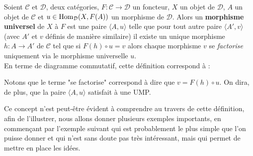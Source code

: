\documentclass{article}
\begin{document}
\begin{definition}{}
    Soient $\mathcal C$ et $\mathcal D$, deux catégories, $F:\mathcal C\to\mathcal D$ un foncteur, $X$ un objet de $\mathcal D$, $A$ un objet de $\mathcal C$ et $u\in\text{Hom}_\mathcal D(X, F(A))$ un morphisme de $\mathcal D$. Alors un \textbf{morphisme universel} de $X$ à $F$ est une paire $\langle A, u\rangle$ telle que pour tout autre paire $\langle A', v\rangle$ (avec $A'$ et $v$ définis de manière similaire) il existe un unique morphisme $h:A\to A'$ de $\mathcal C$ tel que si $F(h)\circ u=v$ alors chaque morphisme $v$ se \textit{factorise} uniquement via le morphisme universelle $u$.\\

    \noindent
    En terme de diagramme commutatif, cette définition correspond à :

    \begin{center}
    \end{center}

    \noindent
    Notons que le terme "se factorise" correspond à dire que $v=F(h)\circ u$. On dira, de plus, que la paire $\langle A, u\rangle$ satisfait à une UMP.
\end{definition}

Ce concept n'est peut-être évident à comprendre au travers de cette définition, afin de l'illustrer, nous allons donner plusieurs exemples importants, en commençant par l'exemple suivant qui est probablement le plus simple que l'on puisse donner et qui n'est sans doute pas très intéressant, mais qui permet de mettre en place les idées.
\end{document}
